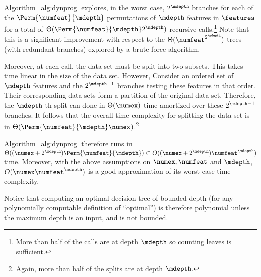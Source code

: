 \documentclass{llncs}
\begin{document}
	 
	 Algorithm~\ref{alg:dynprog} explores, in the worst case, $2^{\mdepth}$ branches for each of the $\Perm{\numfeat}{\mdepth}$ permutations of $\mdepth$ features in $\features$ for a total of $\Theta(\Perm{\numfeat}{\mdepth}2^{\mdepth})$ recursive calls.\footnote{More than half of the calls are at depth $\mdepth$ so counting leaves is sufficient.} 
	 Note that this is a significant improvement with respect to the $\Theta(\numfeat^{2^{\mdepth}})$ trees (with redundant branches) explored by a brute-force algorithm.
	 
	 Moreover, at each call, the data set must be split into two subsets. This takes time linear in the size of the data set. However,  %
	 Consider
	 an ordered set of $\mdepth$ features and the $2^{\mdepth-1}$ branches testing these features in that order. Their corresponding data sets form a partition of the original data set. Therefore, the $\mdepth$-th split can done in $\Theta(\numex)$ time amortized over these $2^{\mdepth-1}$ branches.
	 It follows that the overall time complexity for splitting the data set is in $\Theta(\Perm{\numfeat}{\mdepth}\numex)$.\footnote{Again, more than half of the splits are at depth $\mdepth$.}
	 
	 
	 
	 Algorithm~\ref{alg:dynprog} therefore runs in $\Theta((\numex+2^\mdepth){\Perm{\numfeat}{\mdepth}}) \subset O((\numex + 2^{\mdepth})\numfeat^\mdepth)$ time. Moreover, with the above assumptions on $\numex,\numfeat$ and $\mdepth$, $O(\numex\numfeat^\mdepth)$ is a good approximation of its worst-case time complexity.
	 
	 
	 \medskip
	 
	 Notice that computing an optimal decision tree of bounded depth (for any polynomially computable definition of ``optimal'') is therefore polynomial unless the maximum depth is an input, and is not bounded. %
	 
	 
	 
\end{document}
